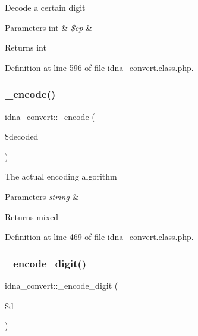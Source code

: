 Decode a certain digit 
\begin{DoxyParams}[1]{Parameters}
int & {\em \$cp} & \\
\hline
\end{DoxyParams}
\begin{DoxyReturn}{Returns}
int 
\end{DoxyReturn}


Definition at line 596 of file idna\+\_\+convert.\+class.\+php.

\hypertarget{classidna__convert_aa32f14e1635b5bcf8a1000721a53db8d}{}\label{classidna__convert_aa32f14e1635b5bcf8a1000721a53db8d} 
\subsubsection{\texorpdfstring{\+\_\+encode()}{\_encode()}}
{\footnotesize\ttfamily idna\+\_\+convert\+::\+\_\+encode (\begin{DoxyParamCaption}\item[{}]{\$decoded }\end{DoxyParamCaption})\hspace{0.3cm}{\ttfamily [protected]}}

The actual encoding algorithm 
\begin{DoxyParams}{Parameters}
{\em string} & \\
\hline
\end{DoxyParams}
\begin{DoxyReturn}{Returns}
mixed 
\end{DoxyReturn}


Definition at line 469 of file idna\+\_\+convert.\+class.\+php.

\hypertarget{classidna__convert_afdb30c72ac13c3c71922afb63fabb37c}{}\label{classidna__convert_afdb30c72ac13c3c71922afb63fabb37c} 
\subsubsection{\texorpdfstring{\+\_\+encode\+\_\+digit()}{\_encode\_digit()}}
{\footnotesize\ttfamily idna\+\_\+convert\+::\+\_\+encode\+\_\+digit (\begin{DoxyParamCaption}\item[{}]{\$d }\end{DoxyParamCaption})\hspace{0.3cm}{\ttfamily [protected]}}

